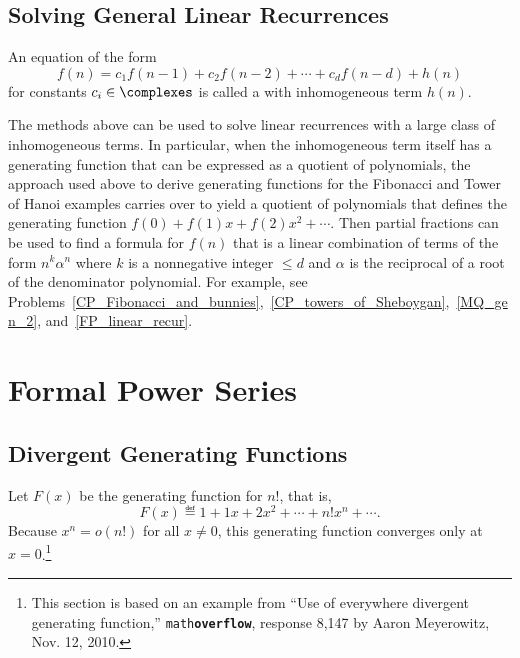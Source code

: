\subsection{Solving General Linear Recurrences}
An equation of the form
\begin{equation}\label{fnc1c2}
f(n) = c_1 f(n-1) + c_2 f(n-2) +  \cdots + c_{d} f(n-d) + h(n)
\end{equation}
for constants $c_i \in \complexes$ is called a  with inhomogeneous term $h(n)$.

The methods above can be used to solve linear recurrences with a large
class of inhomogeneous terms.  In particular, when the inhomogeneous
term itself has a generating function that can be expressed as a
quotient of polynomials, the approach used above to derive generating
functions for the Fibonacci and Tower of Hanoi examples carries over
to yield a quotient of polynomials that defines the generating
function $f(0)+f(1)x+f(2)x^2+\cdots$.  Then partial fractions can be
used to find a formula for $f(n)$ that is a linear combination of
terms of the form $n^k\alpha^n$ where $k$ is a nonnegative integer
$\leq d$ and $\alpha$ is the reciprocal of a root of the denominator
polynomial.  For example, see
Problems~\ref{CP_Fibonacci_and_bunnies},~\ref{CP_towers_of_Sheboygan},~\ref{MQ_gen_2},
and~\ref{FP_linear_recur}.

\begin{problems}
\practiceproblems
{}

\classproblems
{}

\homeworkproblems
{}

\examproblems
{}

\end{problems}

\section{Formal Power Series}\label{sec:power_series}

\subsection{Divergent Generating Functions}
Let $F(x)$ be the generating function for $n!$, that is,
\[
F(x) \eqdef 1 + 1x + 2x^2 + \cdots + n! x^n + \cdots.
\]
Because $x^n = o(n!)$ for all $x \neq 0$, this generating function
converges only at $x=0$.\footnote{This section is based on an example
  from ``Use of everywhere divergent generating function,''
  \texttt{math}\textbf{\texttt{overflow}}, response 8,147 by Aaron
  Meyerowitz, Nov. 12, 2010.}

